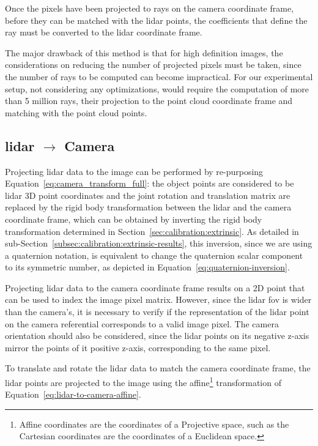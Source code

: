 Once the pixels have been projected to rays on the camera coordinate frame, before they can be matched with the \ac{lidar} points, the coefficients that define the ray must be converted to the \ac{lidar} coordinate frame.

The major drawback of this method is that for high definition images, the considerations on reducing the number of projected pixels must be taken, since the number of rays to be computed can become impractical. For our experimental setup, not considering any optimizations, would require the computation of more than 5 million rays, their projection to the point cloud coordinate frame and matching with the point cloud points.


\subsection{\acs{lidar} $\rightarrow$ Camera}
\label{subsec:sensor-fusion-lidar-to-camera}
Projecting \ac{lidar} data to the image can be performed by re-purposing Equation~\eqref{eq:camera_transform_full}: the object points are considered to be \ac{lidar} 3D point coordinates and the joint rotation and translation matrix are replaced by the rigid body transformation between the \ac{lidar} and the camera coordinate frame, which can be obtained by inverting the rigid body transformation determined in Section~\ref{sec:calibration:extrinsic}. As detailed in sub-Section~\ref{subsec:calibration:extrinsic-results}, this inversion, since we are using a quaternion notation, is equivalent to change the quaternion scalar component to its symmetric number, as depicted in Equation~\eqref{eq:quaternion-inversion}.

Projecting \ac{lidar} data to the camera coordinate frame results on a 2D point that can be used to index the image pixel matrix. However, since the \ac{lidar} \ac{fov} is wider than the camera's, it is necessary to verify if the representation of the \ac{lidar} point on the camera referential corresponds to a valid image pixel. The camera orientation should also be considered, since the \ac{lidar} points on its negative z-axis mirror the points of it positive z-axis, corresponding to the same pixel.

To translate and rotate the \ac{lidar} data to match the camera coordinate frame, the \ac{lidar} points are projected to the image using the affine\footnote{Affine coordinates are the coordinates of a Projective space, such as the Cartesian coordinates are the coordinates of a Euclidean space.} transformation of Equation~\eqref{eq:lidar-to-camera-affine}. 

